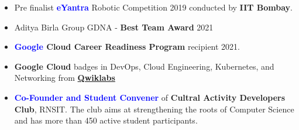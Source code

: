 \begin{itemize}
\item Pre finalist \textbf{\textcolor{blue}{eYantra}} Robotic Competition 2019 conducted by \textbf{IIT Bombay}.
\item Aditya Birla Group GDNA - \textbf{Best Team Award} 2021
\item \textbf{\textcolor{blue}{Google} Cloud Career Readiness Program} recipient 2021.
\item \textbf{Google Cloud} badges in DevOps, Cloud Engineering, Kubernetes, and Networking from \textbf{\textcolor{blue}{\href{https://www.qwiklabs.com/public_profiles/c11f5195-2ad0-4404-83c4-08ad982d139c}{Qwiklabs}}}
\end{itemize}
\smallskip

\begin{itemize}
\item \textbf{\textcolor{blue}{Co-Founder and Student Convener}} of \textbf{ Cultral Activity Developers Club}, RNSIT. The club aims at strengthening the roots of Computer Science and has more than 450 active student participants.
\end{itemize}